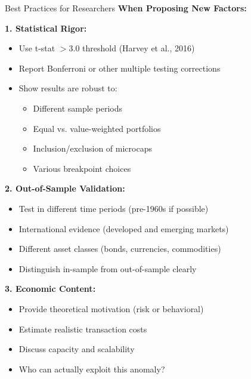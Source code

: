 \documentclass{beamer}
\begin{document}
\begin{frame}{Best Practices for Researchers}
    \textbf{When Proposing New Factors:}
    
    
    \textbf{1. Statistical Rigor:}
    \begin{itemize}
        \item Use t-stat $> 3.0$ threshold (Harvey et al., 2016)
        \item Report Bonferroni or other multiple testing corrections
        \item Show results are robust to:
        \begin{itemize}
            \item Different sample periods
            \item Equal vs. value-weighted portfolios
            \item Inclusion/exclusion of microcaps
            \item Various breakpoint choices
        \end{itemize}
    \end{itemize}
    
    
    \textbf{2. Out-of-Sample Validation:}
    \begin{itemize}
        \item Test in different time periods (pre-1960s if possible)
        \item International evidence (developed and emerging markets)
        \item Different asset classes (bonds, currencies, commodities)
        \item Distinguish in-sample from out-of-sample clearly
    \end{itemize}
    
    
    \textbf{3. Economic Content:}
    \begin{itemize}
        \item Provide theoretical motivation (risk or behavioral)
        \item Estimate realistic transaction costs
        \item Discuss capacity and scalability
        \item Who can actually exploit this anomaly?
    \end{itemize}
\end{frame}
\end{document}
